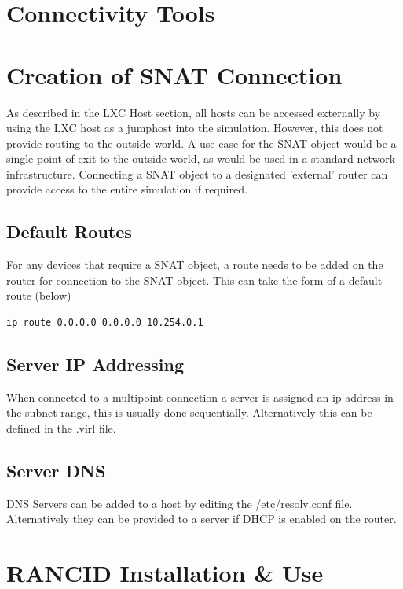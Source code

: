 \documentclass[11pt]{report}
\begin{document}
\section*{Connectivity Tools}

\section*{Creation of SNAT Connection}

As described in the LXC Host section, all hosts can be accessed externally by using the LXC host as a jumphost into the simulation. However, this does not provide routing to the outside world. A use-case for the SNAT object would be a single point of exit to the outside world, as would be used in a standard network infrastructure. Connecting a SNAT object to a designated 'external' router can provide access to the entire simulation if required.

\subsection*{Default Routes}

For any devices that require a SNAT object, a route needs to be added on the router for connection to the SNAT object. This can take the form of a default route (below)

\begin{lstlisting}
ip route 0.0.0.0 0.0.0.0 10.254.0.1
\end{lstlisting}

\subsection*{Server IP Addressing}

When connected to a multipoint connection a server is assigned an ip address in the subnet range, this is usually done sequentially. Alternatively this can be defined in the .virl file.

\subsection*{Server DNS}

DNS Servers can be added to a host by editing the /etc/resolv.conf file. Alternatively they can be provided to a server if DHCP is enabled on the router.

\section*{RANCID Installation \& Use}
\end{document}
